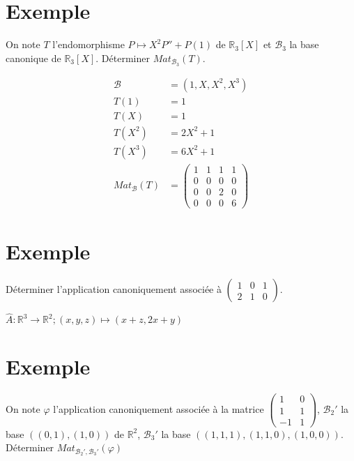\documentclass[../main.tex]{subfiles}
\begin{document}
\section{Exemple}
\begin{tcolorbox}[title=Exemple 28.13, title filled=false, colframe=darkgreen, colback=darkgreen!10!white]
    On note $T$ l'endomorphisme $P\mapsto X^2 P'' + P(1)$ de $\mathbb{R}_3[X]$ et $\mathcal{B}_3$ la base canonique de $\mathbb{R}_3[X]$. Déterminer $Mat_{\mathcal{B}_3}(T)$. 
\end{tcolorbox}

\begin{align*}
    \mathcal{B} &= (1, X, X^2, X^3) \\
    T(1) &= 1 \\
    T(X) &= 1 \\
    T(X^2) &= 2X^2 + 1 \\
    T(X^3) &= 6X^2 + 1 \\
    Mat_{\mathcal{B}}(T) &= \begin{pmatrix}
        1 & 1 & 1 & 1 \\
        0 & 0 & 0 & 0 \\
        0 & 0 & 2 & 0 \\
        0 & 0 & 0 & 6
    \end{pmatrix}
\end{align*}

\section{Exemple}
\begin{tcolorbox}[title=Exemple 28.15, title filled=false, colframe=darkgreen, colback=darkgreen!10!white]
    Déterminer l'application canoniquement associée à $\begin{pmatrix}
        1 & 0 & 1 \\
        2 & 1 & 0
    \end{pmatrix}$. 
\end{tcolorbox}

\noindent $\hat{A}:\mathbb{R}^3\to \mathbb{R}^2; (x, y, z)\mapsto (x + z, 2x + y)$

\section{Exemple}
\begin{tcolorbox}[title=Exemple 28.18, title filled=false, colframe=darkgreen, colback=darkgreen!10!white]
    On note $\varphi$ l'application canoniquement associée à la matrice $\begin{pmatrix}
        1 & 0 \\
        1 & 1 \\
        -1 & 1
    \end{pmatrix}$, $\mathcal{B}_2'$ la base $((0,1),(1,0))$ de $\mathbb{R}^2$, $\mathcal{B}_3'$ la base $((1,1,1),(1,1,0),(1,0,0))$. Déterminer $Mat_{\mathcal{B}_2', \mathcal{B}_3'}(\varphi)$ 
\end{tcolorbox}
\end{document}
